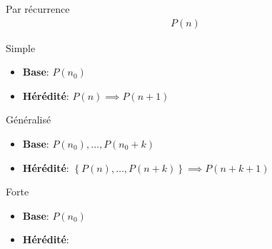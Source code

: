 \begin{parag}{Par récurrence}
   \begin{align*} P\left(n\right) \end{align*} 
   \begin{subparag}{Simple}
       \begin{itemize}
           \item \textbf{Base}: $P\left(n_0\right)$
           \item \textbf{Hérédité}: $P\left(n\right) \implies P\left(n+1\right)$
       \end{itemize}
   \end{subparag}
   \begin{subparag}{Généralisé}
       \begin{itemize}
           \item \textbf{Base}: $P\left(n_0\right), \ldots, P\left(n_0 + k\right)$
           \item \textbf{Hérédité}: $\left\{P\left(n\right), \ldots, P\left(n + k\right)\right\} \implies P\left(n+k+1\right)$
       \end{itemize}
   \end{subparag}
   \begin{subparag}{Forte}
       \begin{itemize}
           \item \textbf{Base}: $P\left(n_0\right)$
           \item \textbf{Hérédité}: 
       \end{itemize}
       
   \end{subparag}
\end{parag}











